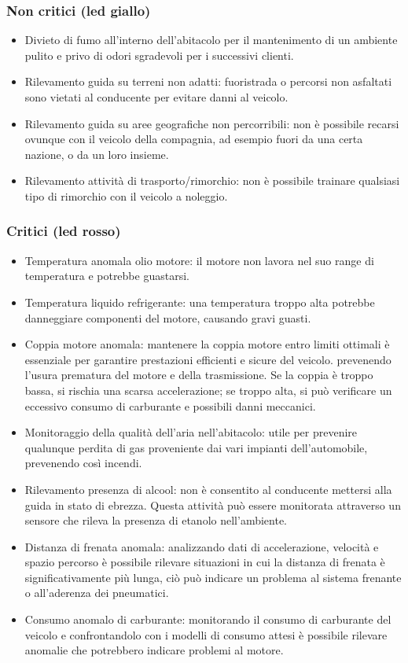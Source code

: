 \documentclass[12pt, a4paper, italian]{report}
\numberwithin{figure}{chapter}
\numberwithin{table}{chapter}
\begin{document}
\subsubsection{Non critici (led giallo)}

\begin{itemize}
    \item Divieto di fumo all'interno dell'abitacolo per il mantenimento di un ambiente pulito e privo di odori sgradevoli per i successivi clienti.
    \item Rilevamento guida su terreni non adatti: fuoristrada o percorsi non asfaltati sono vietati al conducente per evitare danni al veicolo. 
    \item Rilevamento guida su aree geografiche non percorribili: non è possibile recarsi ovunque con il veicolo della compagnia, ad esempio fuori da una certa nazione, o da un loro insieme.
    \item Rilevamento attività di trasporto/rimorchio: non è possibile trainare qualsiasi tipo di rimorchio con il veicolo a noleggio.
\end{itemize}

\subsubsection{Critici (led rosso)}

\begin{itemize}
    \item Temperatura anomala olio motore: il motore non lavora nel suo range di    temperatura e potrebbe guastarsi.
    \item Temperatura liquido refrigerante: una temperatura troppo alta potrebbe danneggiare componenti del motore, causando gravi guasti.
    \item Coppia motore anomala: mantenere la coppia motore entro limiti ottimali è essenziale per garantire prestazioni efficienti e sicure del veicolo. prevenendo l'usura prematura del motore e della trasmissione. Se la coppia è troppo bassa, si rischia una scarsa accelerazione; se troppo alta, si può verificare un eccessivo consumo di carburante e possibili danni meccanici.
    \item Monitoraggio della qualità dell'aria nell'abitacolo: utile per prevenire qualunque perdita di gas proveniente dai vari impianti dell'automobile, prevenendo così incendi.
    \item Rilevamento presenza di alcool: non è consentito al conducente mettersi alla guida in stato di ebrezza. Questa attività può essere monitorata attraverso un sensore che rileva la presenza di etanolo nell'ambiente. \cite{ahmar2021road}
    \item Distanza di frenata anomala: analizzando dati di accelerazione, velocità e spazio percorso è possibile rilevare situazioni in cui la distanza di frenata è significativamente più lunga, ciò può indicare un problema al sistema frenante o all'aderenza dei pneumatici.
    \item Consumo anomalo di carburante: monitorando il consumo di carburante del veicolo e confrontandolo con i modelli di consumo attesi è possibile rilevare anomalie che potrebbero indicare problemi al motore.
\end{itemize}
\end{document}
